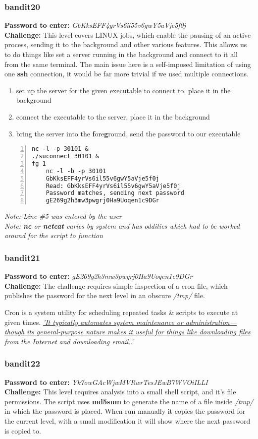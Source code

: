 \documentclass[a4paper]{article}
\newcommand{\pass}[1]{\textbf{Password to enter:} \textit{#1}\\}
\newcommand{\chall}{\textbf{Challenge:} }
\begin{document}
\subsubsection{bandit20}
\pass{GbKksEFF4yrVs6il55v6gwY5aVje5f0j}
\chall This level covers LINUX jobs, which enable the pausing of an active process, sending it to the background and other various features. This allows us to do things like set a server running in the background and connect to it all from the same terminal. The main issue here is a self-imposed limitation of using one \textbf{ssh} connection, it would be far more trivial if we used multiple connections.
\begin{enumerate}
	\item set up the server for the given executable to connect to, place it in the background
	\item connect the executable to the server, place it in the background
	\item bring the server into the \textbf{f}ore\textbf{g}round, send the password to our executable
\end{enumerate}
\begin{lstlisting}[numbers=left]
nc -l -p 30101 &
./suconnect 30101 &
fg 1
	nc -l -b -p 30101
	GbKksEFF4yrVs6il55v6gwY5aVje5f0j
	Read: GbKksEFF4yrVs6il55v6gwY5aVje5f0j
	Password matches, sending next password
	gE269g2h3mw3pwgrj0Ha9Uoqen1c9DGr
\end{lstlisting}
\textit{Note: Line \#5 was entered by the user}\\
\textit{Note: \textbf{nc} or \textbf{netcat} varies by system and has oddities which had to be worked around for the script to function}

\subsubsection{bandit21}
\pass{gE269g2h3mw3pwgrj0Ha9Uoqen1c9DGr}
\chall The challenge requires simple inspection of a cron file, which publishes the password for the next level in an obscure \textit{/tmp/} file.

Cron is a system utility for scheduling repeated tasks \& scripts to execute at given times. \href{https://en.wikipedia.org/wiki/Cron}{\textit{'It typically automates system maintenance or administration—though its general-purpose nature makes it useful for things like downloading files from the Internet and downloading email..'}}

\subsubsection{bandit22}
\pass{Yk7owGAcWjwMVRwrTesJEwB7WVOiILLI}
\chall This level requires analysis into a small shell script, and it's file permissions. The script uses \textbf{md5sum} to generate the name of a file inside \textit{/tmp/} in which the password is placed. When run manually it copies the password for the current level, with a small modification it will show where the next password is copied to.
\end{document}
